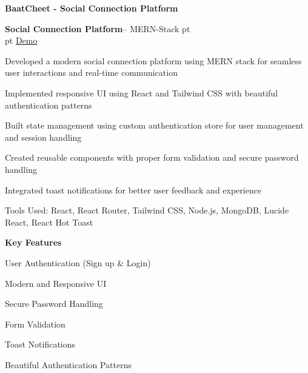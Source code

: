 \documentclass{article}
\newcommand{\AND}{\\}
\begin{document}
\begin{center}
    \Large\textbf{BaatCheet - Social Connection Platform}
\end{center}

\vspace{0.5cm}

\begin{twocolentry}
    \textbf{Social Connection Platform}-- MERN-Stack
     pt%
    \AND%
     pt%
    \href{https://github.com/yourusername/baatcheet}{Demo}
\end{twocolentry}

\vspace{0.10 cm}
\begin{onecolentry}
    \begin{highlights}
        \item Developed a modern social connection platform using MERN stack for seamless user interactions and real-time communication
        \item Implemented responsive UI using React and Tailwind CSS with beautiful authentication patterns
        \item Built state management using custom authentication store for user management and session handling
        \item Created reusable components with proper form validation and secure password handling
        \item Integrated toast notifications for better user feedback and experience
        \item Tools Used: React, React Router, Tailwind CSS, Node.js, MongoDB, Lucide React, React Hot Toast
    \end{highlights}
\end{onecolentry}

\vspace{0.5cm}

\begin{center}
    \textbf{Key Features}
\end{center}

\begin{highlights}
    \item User Authentication (Sign up \& Login)
    \item Modern and Responsive UI
    \item Secure Password Handling
    \item Form Validation
    \item Toast Notifications
    \item Beautiful Authentication Patterns
\end{highlights}
\end{document}
